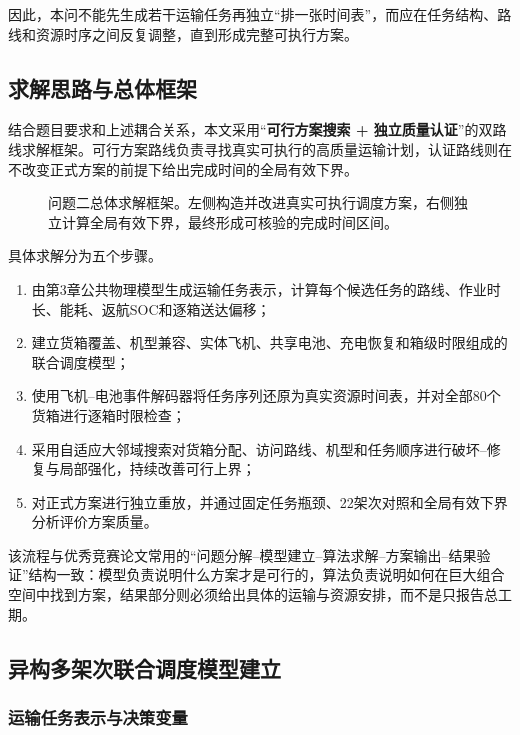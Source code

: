 \documentclass[UTF8,a4paper,12pt]{ctexart}
\begin{document}
因此，本问不能先生成若干运输任务再独立“排一张时间表”，而应在任务结构、路线和资源时序之间反复调整，直到形成完整可执行方案。

\subsection{求解思路与总体框架}

结合题目要求和上述耦合关系，本文采用“\textbf{可行方案搜索 + 独立质量认证}”的双路线求解框架。可行方案路线负责寻找真实可执行的高质量运输计划，认证路线则在不改变正式方案的前提下给出完成时间的全局有效下界。

\begin{figure}[H]
  \centering
  \resizebox{0.94\textwidth}{!}{\QTwoFigFramework}
  \caption{问题二总体求解框架。左侧构造并改进真实可执行调度方案，右侧独立计算全局有效下界，最终形成可核验的完成时间区间。}
  \label{fig:q2_framework_v7}
\end{figure}

具体求解分为五个步骤。

\begin{enumerate}[label=\textbf{步骤\arabic*.},leftmargin=4.5em]
  \item 由第3章公共物理模型生成运输任务表示，计算每个候选任务的路线、作业时长、能耗、返航SOC和逐箱送达偏移；
  \item 建立货箱覆盖、机型兼容、实体飞机、共享电池、充电恢复和箱级时限组成的联合调度模型；
  \item 使用飞机--电池事件解码器将任务序列还原为真实资源时间表，并对全部80个货箱进行逐箱时限检查；
  \item 采用自适应大邻域搜索对货箱分配、访问路线、机型和任务顺序进行破坏--修复与局部强化，持续改善可行上界；
  \item 对正式方案进行独立重放，并通过固定任务瓶颈、22架次对照和全局有效下界分析评价方案质量。
\end{enumerate}

该流程与优秀竞赛论文常用的“问题分解--模型建立--算法求解--方案输出--结果验证”结构一致：模型负责说明什么方案才是可行的，算法负责说明如何在巨大组合空间中找到方案，结果部分则必须给出具体的运输与资源安排，而不是只报告总工期。

\subsection{异构多架次联合调度模型建立}

\subsubsection{运输任务表示与决策变量}
\end{document}
